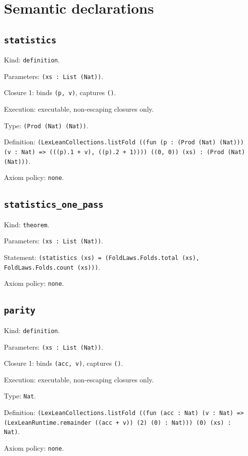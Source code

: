 \documentclass[11pt]{article}
\begin{document}
\section*{Semantic declarations}
\subsection*{\texttt{statistics}}
\noindent Kind: \texttt{definition}.\par
\noindent Parameters: \texttt{(xs : List (Nat))}.\par
\noindent Closure 1: binds \texttt{(p, v)}, captures \texttt{()}.\par
\noindent Execution: executable, non-escaping closures only.\par
\noindent Type: \texttt{(Prod (Nat) (Nat))}.\par
\noindent Definition: \texttt{(LexLeanCollections.listFold ((fun (p : (Prod (Nat) (Nat))) (v : Nat) => (((p).1 + v), ((p).2 + 1)))) ((0, 0)) (xs) : (Prod (Nat) (Nat)))}.\par
\noindent Axiom policy: \texttt{none}.\par
\subsection*{\texttt{statistics\_one\_pass}}
\noindent Kind: \texttt{theorem}.\par
\noindent Parameters: \texttt{(xs : List (Nat))}.\par
\noindent Statement: \texttt{(statistics (xs) = (FoldLaws.Folds.total (xs), FoldLaws.Folds.count (xs)))}.\par
\noindent Axiom policy: \texttt{none}.\par
\subsection*{\texttt{parity}}
\noindent Kind: \texttt{definition}.\par
\noindent Parameters: \texttt{(xs : List (Nat))}.\par
\noindent Closure 1: binds \texttt{(acc, v)}, captures \texttt{()}.\par
\noindent Execution: executable, non-escaping closures only.\par
\noindent Type: \texttt{Nat}.\par
\noindent Definition: \texttt{(LexLeanCollections.listFold ((fun (acc : Nat) (v : Nat) => (LexLeanRuntime.remainder ((acc + v)) (2) (0) : Nat))) (0) (xs) : Nat)}.\par
\noindent Axiom policy: \texttt{none}.\par
\end{document}
